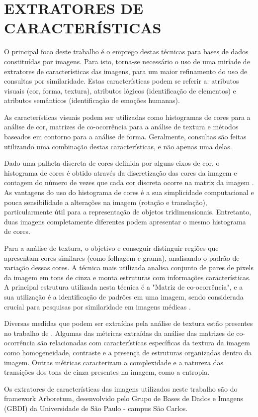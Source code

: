 \section{EXTRATORES DE CARACTERÍSTICAS}
\label{sec:extcarac}
O principal foco deste trabalho é o emprego destas técnicas para bases de dados constituídas por imagens. Para isto, torna-se necessário o uso de uma miríade de extratores de características
das imagens, para um maior refinamento do uso de consultas por similaridade. Estas características podem se referir a: atributos visuais (cor, forma, textura), atributos lógicos (identificação
de elementos) e atributos semânticos (identificação de emoções humanas).\par

As características visuais podem ser utilizadas como histogramas de cores para a análise de cor, matrizes de co-ocorrência para a análise de textura e
métodos baseados em contorno para a análise de forma. Geralmente, consultas são feitas utilizando uma combinação destas características, e não apenas uma delas.\par

Dado uma palheta discreta de cores definida por alguns eixos de cor, o histograma de cores é obtido através da discretização das cores da imagem e contagem
do número de vezes que cada cor discreta ocorre na matriz da imagem \cite{Swain1991}. As vantagens do uso do histograma de cores é a sua simplicidade computacional e pouca
sensibilidade a alterações na imagem (rotação e translação), particularmente útil para a representação de objetos tridimensionais. Entretanto, duas imagens completamente 
diferentes podem apresentar o mesmo histograma de cores.\par

Para a análise de textura, o objetivo e conseguir distinguir regiões que apresentam cores similares (como folhagem e grama), analisando o padrão
de variação dessas cores. A técnica mais utilizada analisa conjunto de pares de pixels da imagem em tons de cinza e monta estruturas com informações características.
A principal estrutura utilizada nesta técnica é a "Matriz de co-ocorrência", e a sua utilização é a identificação de padrões
em uma imagem, sendo considerada crucial para pesquisas por similaridade em imagens médicas \cite{Glatard2004}.\par
												
Diversas medidas que podem ser extraídas pela análise de textura estão presentes no trabalho de \cite{Haralick1973}. Algumas das métricas extraídas
da análise das matrizes de co-ocorrência são  relacionadas com características específicas da textura da imagem como homogeneidade, contraste
e a presença de estruturas organizadas dentro da imagem. Outras métricas caracterizam a complexidade e a natureza das transições dos tons de cinza presentes
na imagem, como a entropia.\par

Os extratores de características das imagens utilizados neste trabalho são do framework Arboretum, desenvolvido pelo Grupo de Bases de Dados e Imagens (GBDI) da Universidade de São Paulo - campus São Carlos.


